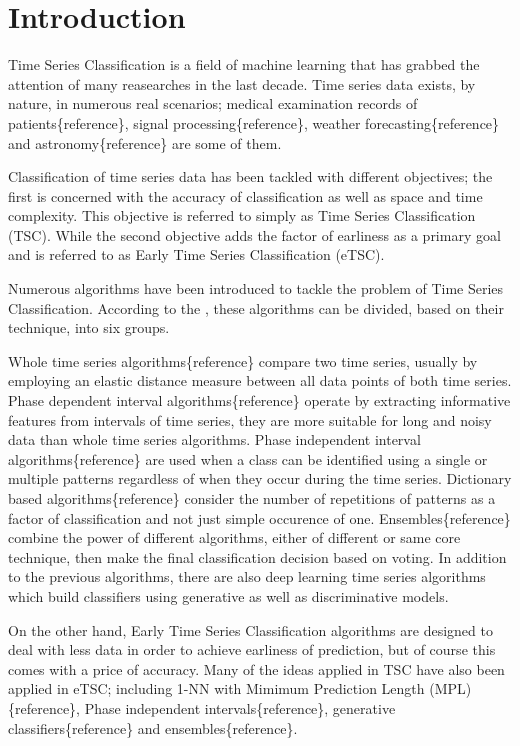 \chapter{Introduction}
\label{ChapterIntroduction}
Time Series Classification is a field of machine learning that has grabbed the attention of many reasearches in the last decade.
Time series data exists, by nature, in numerous real scenarios; medical examination records of patients\{reference\}, signal processing\{reference\}, weather forecasting\{reference\} and astronomy\{reference\} are some of them.

Classification of time series data has been tackled with different objectives; the first is concerned with the accuracy of classification as well as space and time complexity. This objective is referred to simply as Time Series Classification (TSC). While the second objective adds the factor of earliness as a primary goal and is referred to as Early Time Series Classification (eTSC).

Numerous algorithms have been introduced to tackle the problem of Time Series Classification. According to the \cite{bagnall2017great}, these algorithms can be divided, based on their technique, into six groups.

Whole time series algorithms\{reference\} compare two time series, usually by employing an elastic distance measure between all data points of both time series.
Phase dependent interval algorithms\{reference\} operate by extracting informative features from intervals of time series, they are more suitable for long and noisy data than whole time series algorithms.
Phase independent interval algorithms\{reference\} are used when a class can be identified using a single or multiple patterns regardless of when they occur during the time series.
Dictionary based algorithms\{reference\} consider the number of repetitions of patterns as a factor of classification and not just simple occurence of one.
Ensembles\{reference\} combine the power of different algorithms, either of different or same core technique, then make the final classification decision based on voting.
In addition to the previous algorithms, there are also deep learning time series algorithms which build classifiers using generative as well as discriminative models.

On the other hand, Early Time Series Classification algorithms are designed to deal with less data in order to achieve earliness of prediction, but of course this comes with a price of accuracy.
Many of the ideas applied in TSC have also been applied in eTSC; including 1-NN with Mimimum Prediction Length (MPL)\{reference\}, Phase independent intervals\{reference\}, generative classifiers\{reference\} and ensembles\{reference\}.


